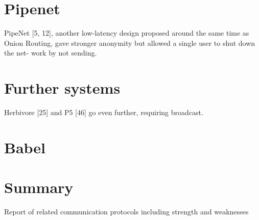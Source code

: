 \section{Pipenet}
PipeNet [5, 12], another low-latency design proposed
around the same time as Onion Routing, gave stronger
anonymity but allowed a single user to shut down the net-
work by not sending. 



\section{Further systems}

Herbivore [25] and P5 [46]
go even further, requiring broadcast. 
\section{Babel}
\section{Summary}
Report of related communication protocols including strength and weaknesses
